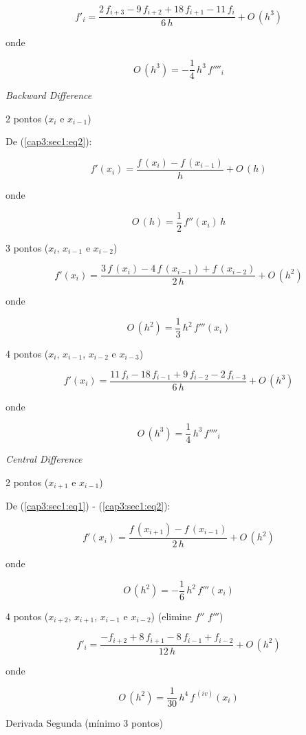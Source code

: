 \begin{enumerar}
\begin{enumerar}
\[
 f'_i = \frac{2\,f_{i+3} - 9\,f_{i+2} + 18\,f_{i+1} - 11\,f_i}{6\,h} + O\,(h^3)
\]

onde

\[
 O\,(h^3) = - \frac{1}{4} \, h^3 \, f''''_i
\]

\item \textit{Backward Difference}

2 pontos ($x_{i}$ e $x_{i-1}$)

De (\ref{cap3:sec1:eq2}):

\[
 f'(x_i) = \frac{f\,(x_i) - f\,(x_{i-1})}{h} + O\,(h)
\]

onde

\[
 O\,(h) = \frac{1}{2}\,f''(x_i)\,h
\]

3 pontos ($x_{i}$, $x_{i-1}$ e $x_{i-2}$)

\[
 f'(x_i) = \frac{3\,f\,(x_i) - 4\,f\,(x_{i-1}) + f\,(x_{i-2})}{2\,h} + O\,(h^2)
\]

onde

\[
 O\,(h^2) = \frac{1}{3}\,h^2\,f'''(x_i)
\]

4 pontos ($x_{i}$, $x_{i-1}$, $x_{i-2}$ e $x_{i-3}$)

\[
 f'(x_i) = \frac{11\,f_i - 18\,f_{i-1} + 9\,f_{i-2} - 2\,f_{i-3}}{6\,h} + O\,(h^3)
\]

onde

\[
 O\,(h^3) = \frac{1}{4}\,h^3\,f''''_i
\]

\item \textit{Central Difference}

2 pontos ($x_{i+1}$ e $x_{i-1}$)

De (\ref{cap3:sec1:eq1}) - (\ref{cap3:sec1:eq2}):

\[
 f'(x_i) = \frac{f\,(x_{i+1}) - f\,(x_{i-1})}{2\,h} + O\,(h^2)
\]

onde

\[
 O\,(h^2) = -\frac{1}{6}\,h^2\,f'''(x_i)
\]

4 pontos ($x_{i+2}$, $x_{i+1}$, $x_{i-1}$ e $x_{i-2}$) (elimine $f''$ $f'''$)

\[
 f'_i = \frac{-f_{i+2} + 8\,f_{i+1} - 8\,f_{i-1} + f_{i-2}}{12\,h} + O\,(h^2)
\]

onde

\[
 O\,(h^2) = \frac{1}{30} \, h^4 \, f^{\,(iv)}(x_i)
\]

 \end{enumerar}

\item Derivada Segunda (mínimo 3 pontos)

\begin{enumerar}


\end{enumerar}
\end{enumerar}

